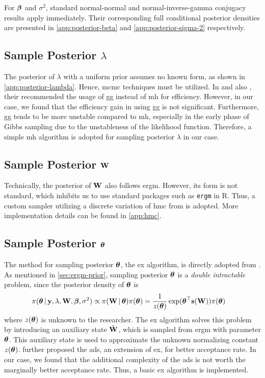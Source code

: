 \documentclass[a4paper]{article}
\begin{document}
For $\boldsymbol{\beta}$ and $\sigma^2$,
standard normal-normal and normal-inverse-gamma conjugacy results apply immediately.
Their corresponding full conditional posterior densities are presented in
\autoref{app:posterior-beta} and \autoref{app:posterior-sigma-2} respectively.

\subsection{Sample Posterior \texorpdfstring{$\lambda$}{lambda}}

The posterior of $\lambda$ with a uniform prior assumes no known form, as shown in \autoref{app:posterior-lambda}.
Hence, \gls{mcmc} techniques must be utilized.
In \cite{lesage-pace-2009} and also \cite{ritter-tanner-1992},
their recommended the usage of \gls{gg} instead of \gls{mh} for efficiency.
However, in our case, we found that the efficiency gain in using \gls{gg} is not significant.
Furthermore, \gls{gg} tends to be more unstable compared to \gls{mh},
especially in the early phase of Gibbs sampling due to the unstableness of the likelihood function.
Therefore, a simple \gls{mh} algorithm is adopted for sampling posterior $\lambda$ in our case.

\subsection{Sample Posterior \texorpdfstring{$\mathbf{W}$}{W}}

Technically, the posterior of $\mathbf{W}$ also follows \gls{ergm}.
However, its form is not standard, which inhibits us to use standard packages such as \Verb"ergm"  in R.
Thus, a custom sampler utilizing a discrete variation of \gls{hmc} from \cite{pakman-paninski-2015} is adopted.
More implementation details can be found in \autoref{app:hmc}.

\subsection{Sample Posterior \texorpdfstring{$\boldsymbol{\theta}$}{theta}}

The method for sampling posterior $\boldsymbol{\theta}$,
the \gls{ex} algorithm, is directly adopted from \cite{caimo-friel-2011}.
As mentioned in \autoref{sec:ergm-prior}, sampling posterior $\boldsymbol{\theta}$ is a \emph{double intractable} problem,
since the posterior density of $\boldsymbol{\theta}$ is
\begin{align*}
	\pi(\boldsymbol{\theta}\,|\,\mathbf{y},\lambda,\mathbf{W},\boldsymbol{\beta},\sigma^2)
	&\propto \pi(\mathbf{W}\,|\,\boldsymbol{\theta})\pi(\boldsymbol{\theta})
	= \frac{1}{z(\boldsymbol{\theta})} \exp(\boldsymbol{\theta}^\top\mathbf{s}(\mathbf{W})) \pi(\boldsymbol{\theta})
\end{align*}
where $z(\boldsymbol{\theta})$ is unknown to the researcher.
The \gls{ex} algorithm solves this problem by introducing an auxiliary state $\tilde{\mathbf{W}}$,
which is sampled from \gls{ergm} with parameter $\boldsymbol{\theta}$.
This auxiliary state is used to approximate the unknown normalizing constant $z(\boldsymbol{\theta})$.
\cite{caimo-friel-2011} further proposed the \gls{ads},
an extension of \gls{ex}, for better acceptance rate.
In our case,
we found that the additional complexity of the \gls{ads} is not worth the marginally better acceptance rate.
Thus, a basic \gls{ex} algorithm is implemented.
\end{document}
